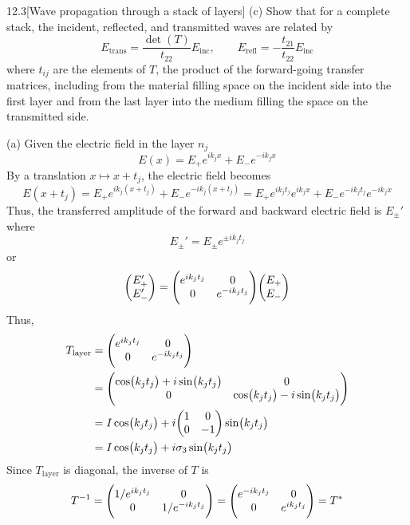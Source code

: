 \documentclass[12pt]{article}
\begin{document}
\begin{problem}{12.3}[Wave propagation through a stack of layers]
(c) Show that for a complete stack, the incident, reflected, and transmitted
waves are related by
\begin{equation}
    E_\text{trans}=\frac{\det(T)}{t_{22}}E_\text{inc},\qquad
    E_\text{refl}=-\frac{t_{21}}{t_{22}}E_\text{inc}
\end{equation}
where $t_{ij}$ are the elements of $T$, the product of the forward-going
transfer matrices, including from the material filling space on the incident
side into the first layer and from the last layer into the medium filling the
space on the transmitted side.
\begin{solution}
(a) Given the electric field in the layer $n_j$
\begin{equation}
    E(x)=E_+e^{ik_jx}+E_-e^{-ik_jx} 
\end{equation}
By a translation $x\mapsto x+t_j$, the electric field becomes
\begin{equation}
    E(x+t_j)=E_+e^{ik_j(x+t_j)}+E_-e^{-ik_j(x+t_j)}
    =E_+e^{ik_jt_j}e^{ik_jx}+E_-e^{-ik_jt_j}e^{-ik_jx}
\end{equation}
Thus, the transferred amplitude of the forward and backward electric field is
$E_\pm'$ where
\begin{equation}
    E_\pm'=E_\pm e^{\pm ik_jt_j}
\end{equation}
or
\begin{equation}
    \mqty(E_+'\\E_-')=\mqty(e^{ik_jt_j}&0\\0&e^{-ik_jt_j})\mqty(E_+\\E_-)
\end{equation}
Thus,
\begin{align}
    T_\text{layer}
    &=\mqty(e^{ik_jt_j}&0\\0&e^{-ik_jt_j})\notag\\
    &=\mqty(\cos(k_jt_j)+i\sin(k_jt_j)&0\\0&\cos(k_jt_j)-i\sin(k_jt_j))\notag\\
    &=I\cos(k_jt_j)+i\mqty(1&0\\0&-1)\sin(k_jt_j)\notag\\
    &=I\cos(k_jt_j)+i\sigma_3\sin(k_jt_j)
\end{align}
Since $T_\text{layer}$ is diagonal, the inverse of $T$ is
\begin{align}
    T^{-1}=\mqty(1/e^{ik_jt_j}&0\\0&1/e^{-ik_jt_j})
    =\mqty(e^{-ik_jt_j}&0\\0&e^{ik_jt_j})
    =T^\ast
\end{align}


\end{solution}
\end{problem}
\end{document}
